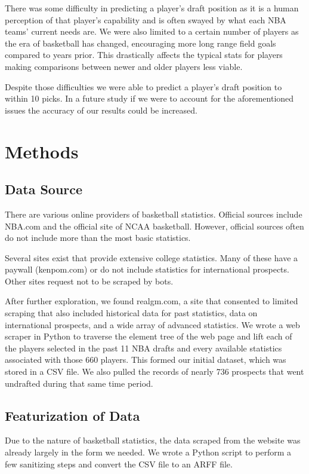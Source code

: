 \documentclass{article}
\begin{document}
There was some difficulty in predicting a player’s draft position as it is a
human perception of that player’s capability and is often swayed by what each
NBA teams’ current needs are. We were also limited to a certain number of
players as the era of basketball has changed, encouraging more long range field
goals compared to years prior. This drastically affects the typical stats for
players making comparisons between newer and older players less viable.

Despite those difficulties we were able to predict a player’s draft position to
within 10 picks. In a future study if we were to account for the aforementioned
issues the accuracy of our results could be increased.

\section{Methods}

\subsection{Data Source}

There are various online providers of basketball statistics. Official sources
include NBA.com and the official site of NCAA basketball. However, official
sources often do not include more than the most basic statistics.

Several sites exist that provide extensive college statistics. Many of these
have a paywall (kenpom.com) or do not include statistics for international
prospects. Other sites request not to be scraped by bots.

After further exploration, we found realgm.com, a site that consented to limited
scraping that also included historical data for past statistics, data on
international prospects, and a wide array of advanced statistics. We wrote a web
scraper in Python to traverse the element tree of the web page and lift each of
the players selected in the past 11 NBA drafts and every available statistics
associated with those 660 players. This formed our initial dataset, which was
stored in a CSV file. We also pulled the records of nearly 736 prospects that
went undrafted during that same time period. 

\subsection{Featurization of Data}

Due to the nature of basketball statistics, the data scraped from the website
was already largely in the form we needed. We wrote a Python script to perform a
few sanitizing steps and convert the CSV file to an ARFF file.
\end{document}

